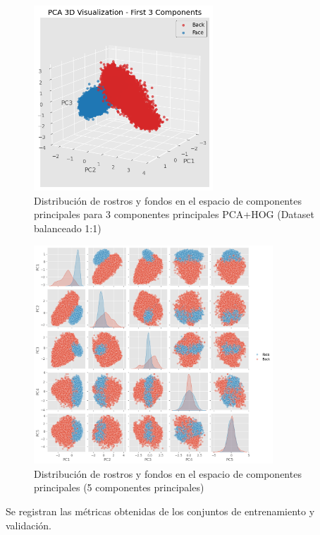 \documentclass{article}
\begin{document}
\begin{figure}[H]
    \centering
    \includegraphics[width=0.6\textwidth]{tarea_4/imagenes/pca_classes_x1_v1_20_3_components.png}
    \caption{Distribución de rostros y fondos en el espacio de componentes principales para 3 componentes principales PCA+HOG (Dataset balanceado 1:1)}
    \label{fig:pca_classes}
\end{figure}

\begin{figure}[H]
    \centering
    \includegraphics[width=0.8\textwidth]{tarea_4/imagenes/pairplot_x1_v1_20.png}
    \caption{Distribución de rostros y fondos en el espacio de componentes principales (5 componentes principales)}
    \label{fig:pca_classes}
\end{figure}

Se registran las métricas obtenidas de los conjuntos de entrenamiento y validación.
\end{document}
